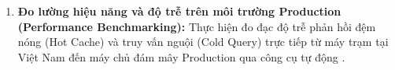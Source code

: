 \begin{enumerate}[leftmargin=2em]
    \item \textbf{Đo lường hiệu năng và độ trễ trên môi trường Production (Performance Benchmarking):}
    Thực hiện đo đạc độ trễ phản hồi đệm nóng (Hot Cache) và truy vấn nguội (Cold Query) trực tiếp từ máy trạm tại Việt Nam đến máy chủ đám mây Production qua công cụ tự động .
\end{enumerate}
